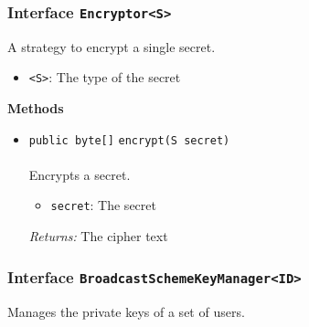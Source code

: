 \subsubsection{Interface \lstinline|Encryptor<S>|}
A strategy to encrypt a single secret. \\
\noindent\begin{minipage}[t]{5cm}
\vspace{0.3em}
\hspace*{2em}
\vspace{0.3em}
\end{minipage}

\begin{itemize}
\item \lstinline|<S>|: The type of the secret
\end{itemize}




\textbf{\sffamily Methods}
\begin{itemize}
\item \lstinline|public byte[]| \lstinline|encrypt|\lstinline|(S secret)|\\ \\[-0.6em]
Encrypts a secret.
\begin{itemize}
\item \lstinline|secret|: The secret
\end{itemize}

\emph{Returns:} The cipher text

\end{itemize}

\subsubsection{Interface \lstinline|BroadcastSchemeKeyManager<ID>|}
Manages the private keys of a set of users. \\
\noindent\begin{minipage}[t]{5cm}
\vspace{0.3em}
\hspace*{2em}
\vspace{0.3em}
\end{minipage}


